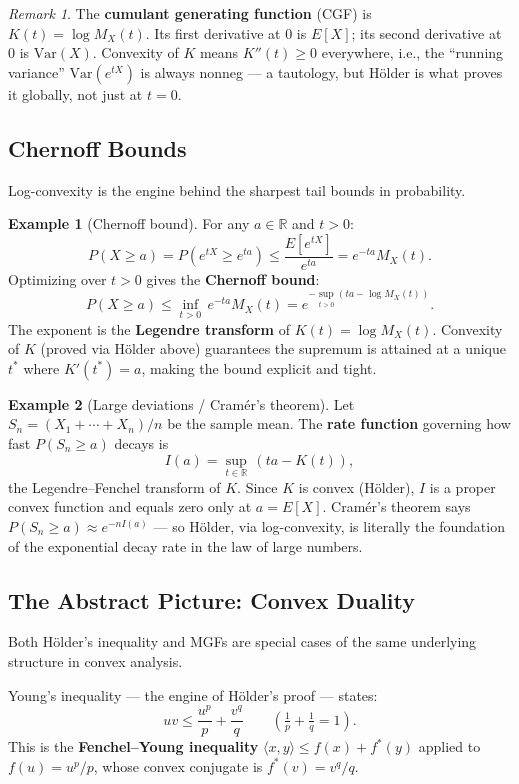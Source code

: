 \documentclass[11pt]{article}
\newcommand{\R}{\mathbb{R}}
\theoremstyle{myplain}
\theoremstyle{definition}
\newtheorem{example}{Example}
\theoremstyle{remark}
\newtheorem*{remark}{Remark}
\begin{document}
\begin{remark}
The \textbf{cumulant generating function} (CGF) is $K(t) = \log M_X(t)$. Its first derivative at 0 is $E[X]$; its second derivative at 0 is $\mathrm{Var}(X)$. Convexity of $K$ means $K''(t) \geq 0$ everywhere, i.e., the ``running variance'' $\mathrm{Var}(e^{tX})$ is always nonneg --- a tautology, but Hölder is what proves it globally, not just at $t=0$.
\end{remark}

\subsection{Chernoff Bounds}

Log-convexity is the engine behind the sharpest tail bounds in probability.

\begin{example}[Chernoff bound]
For any $a \in \R$ and $t > 0$:
\[
  P(X \geq a) = P(e^{tX} \geq e^{ta}) \leq \frac{E[e^{tX}]}{e^{ta}} = e^{-ta} M_X(t).
\]
Optimizing over $t > 0$ gives the \textbf{Chernoff bound}:
\[
  P(X \geq a) \leq \inf_{t > 0}\, e^{-ta} M_X(t) = e^{-\sup_{t>0}(ta - \log M_X(t))}.
\]
The exponent is the \textbf{Legendre transform} of $K(t) = \log M_X(t)$. Convexity of $K$ (proved via Hölder above) guarantees the supremum is attained at a unique $t^*$ where $K'(t^*) = a$, making the bound explicit and tight.
\end{example}

\begin{example}[Large deviations / Cramér's theorem]
Let $S_n = (X_1 + \cdots + X_n)/n$ be the sample mean. The \textbf{rate function} governing how fast $P(S_n \geq a)$ decays is
\[
  I(a) = \sup_{t \in \R}\, (ta - K(t)),
\]
the Legendre--Fenchel transform of $K$. Since $K$ is convex (Hölder), $I$ is a proper convex function and equals zero only at $a = E[X]$. Cramér's theorem says $P(S_n \geq a) \approx e^{-nI(a)}$ --- so Hölder, via log-convexity, is literally the foundation of the exponential decay rate in the law of large numbers.
\end{example}

\subsection{The Abstract Picture: Convex Duality}

Both Hölder's inequality and MGFs are special cases of the same underlying structure in convex analysis.

Young's inequality --- the engine of Hölder's proof --- states:
\[
  uv \leq \frac{u^p}{p} + \frac{v^q}{q} \qquad \left(\tfrac{1}{p}+\tfrac{1}{q}=1\right).
\]
This is the \textbf{Fenchel--Young inequality} $\langle x, y\rangle \leq f(x) + f^*(y)$ applied to $f(u) = u^p/p$, whose convex conjugate is $f^*(v) = v^q/q$.
\end{document}
